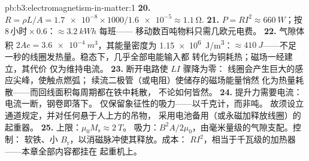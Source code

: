 \begin{solution}{pb:b3:electromagnetism-in-matter:1}
\textbf{20.} $R = \rho L/A = \num{1.7e-8}\times1000/
\num{1.6e-5} \approx \qty{1.1}{\ohm}$.
\textbf{21.} $P = RI^2 \approx \qty{660}{W}$；按
$8\,\text{小时}\times0.6$：$\approx\qty{3.2}{kWh}$ 每班——
移动数百吨物料只需几欧元电费。
\textbf{22.} 气隙体积 $2Ae = \qty{3.6e-4}{m^3}$，其能量密度为
\qty{1.15e6}{J/m^3}：$\approx\qty{410}{J}$——不足
一秒的线圈发热量。稳态下，几乎全部电能输入都
转化为铜耗热；磁场一经建立，其代价
仅为维持电流。
\textbf{23.} 断开电路使 $LI$ 骤降为零：
线圈会产生巨大的感应尖峰，使触点燃弧；
续流二极管（或电阻）使储存的磁场能量悄然
化为热量耗散——而回线面积每周期都在铁中耗散，
不论如何皆然。
\textbf{24.} 提升力需要电流：电流一断，钢卷即落下。
仅保留象征性的吸力——以千克计，而非吨。
故须设立通道规定，并对任何悬于人上方的吊物，
采用电池备用（或永磁加释放线圈）的起重器。
\textbf{25.} 上限：$\mu_0M_{\text{s}} \approx \qty{2}{T}$。
吸力：$B^2A/2\mu_0$，由毫米量级的气隙支配。控制：
软铁、小 $B_{\text{r}}$，以消磁脉冲使其释放。成本：
$RI^2$，相当于千瓦级的加热器——本章全部内容都挂在
起重机上。
\end{solution}
